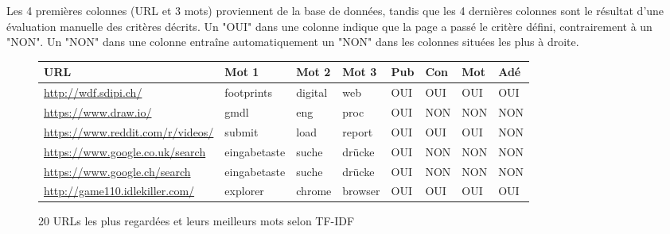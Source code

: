 				Les 4 premières colonnes (URL et 3 mots) proviennent de la base de données, tandis que les 4 dernières colonnes sont le résultat d'une évaluation manuelle des critères décrits. Un "OUI" dans une colonne indique que la page a passé le critère défini, contrairement à un "NON". Un "NON" dans une colonne entraîne automatiquement un "NON" dans les colonnes situées les plus à droite.

\begin{figure}
\centering
\caption{20 URLs les plus regardées et leurs meilleurs mots selon TF-IDF}
\label{table-tfidf}
\begin{tabular}{llllllll}
\textbf{URL}                                          & \textbf{Mot 1}  & \textbf{Mot 2}           & \textbf{Mot 3} & \textbf{Pub}           & \textbf{Con}            & \textbf{Mot}               & \textbf{Adé}            \\ \hline
\scriptsize \url{http://wdf.sdipi.ch/}                              & footprints      & digital                  & web            & \cellcolor[HTML]{9AFF99}OUI & \cellcolor[HTML]{9AFF99}OUI & \cellcolor[HTML]{9AFF99}OUI & \cellcolor[HTML]{9AFF99}OUI \\
\scriptsize \url{https://www.draw.io/}                                  & gmdl            & eng                      & proc           & \cellcolor[HTML]{9AFF99}OUI & \cellcolor[HTML]{FFCCC9}NON & \cellcolor[HTML]{FFCCC9}NON & \cellcolor[HTML]{FFCCC9}NON \\
\scriptsize \url{https://www.reddit.com/r/videos/}                      & submit          & load                     & report         & \cellcolor[HTML]{9AFF99}OUI & \cellcolor[HTML]{9AFF99}OUI & \cellcolor[HTML]{9AFF99}OUI & \cellcolor[HTML]{FFCCC9}NON \\
\scriptsize \url{https://www.google.co.uk/search}                       & eingabetaste    & suche                    & drücke         & \cellcolor[HTML]{9AFF99}OUI & \cellcolor[HTML]{FFCCC9}NON & \cellcolor[HTML]{FFCCC9}NON & \cellcolor[HTML]{FFCCC9}NON \\
\scriptsize \url{https://www.google.ch/search}                          & eingabetaste    & suche                    & drücke         & \cellcolor[HTML]{9AFF99}OUI & \cellcolor[HTML]{FFCCC9}NON & \cellcolor[HTML]{FFCCC9}NON & \cellcolor[HTML]{FFCCC9}NON \\
\scriptsize \url{http://game110.idlekiller.com/}                        & explorer        & chrome                   & browser        & \cellcolor[HTML]{9AFF99}OUI & \cellcolor[HTML]{9AFF99}OUI & \cellcolor[HTML]{9AFF99}OUI & \cellcolor[HTML]{9AFF99}OUI \\

\end{tabular}
\end{figure}

